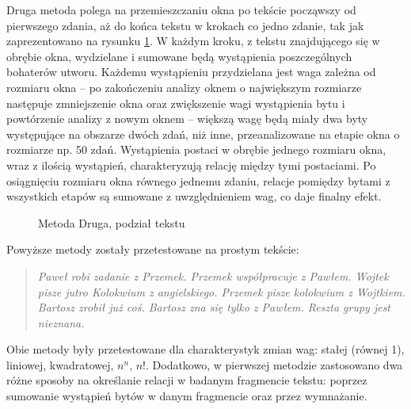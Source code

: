 \documentclass[12pt,a4paper]{article} %
\begin{document}
Druga metoda polega na przemieszczaniu okna po tekście począwszy od pierwszego zdania, aż do końca tekstu w krokach co jedno zdanie, tak jak zaprezentowano na rysunku \ref{fig:plyw}. W każdym kroku, z tekstu znajdującego się w obrębie okna, wydzielane i sumowane będą wystąpienia poszczególnych bohaterów utworu. Każdemu wystąpieniu przydzielana jest waga zależna od rozmiaru okna -- po zakończeniu analizy oknem o największym rozmiarze następuje zmniejszenie okna oraz zwiększenie wagi wystąpienia bytu i powtórzenie analizy z nowym oknem -- większą wagę będą miały dwa byty występujące na obszarze dwóch zdań, niż inne, przeanalizowane na etapie okna o rozmiarze np. 50 zdań. Wystąpienia postaci w obrębie jednego rozmiaru okna, wraz z ilością wystąpień, charakteryzują relację między tymi postaciami. Po osiągnięciu rozmiaru okna równego jednemu zdaniu, relacje pomiędzy bytami z wszystkich etapów są sumowane z uwzględnieniem wag, co daje finalny efekt.
\begin{figure}[!h]
\caption{Metoda Druga, podział tekstu}
\label{fig:plyw}
\centering
\end{figure}

Powyższe metody zostały przetestowane na prostym tekście:
\begin{quote}
    \textit{
        Paweł robi zadanie z Przemek.
        Przemek współpracuje z Pawłem.
        Wojtek pisze jutro Kolokwium z angielskiego.
        Przemek pisze kolokwium z Wojtkiem.
        Bartosz zrobił już coś.
        Bartosz zna się tylko z Pawłem.
        Reszta grupy jest nieznana.}
\end{quote}

Obie metody były przetestowane dla charakterystyk zmian wag: stałej (równej 1), liniowej, kwadratowej, $n^n$, $n!$. Dodatkowo, w pierwszej metodzie zastosowano dwa różne sposoby na określanie relacji w badanym fragmencie tekstu: poprzez sumowanie wystąpień bytów w danym fragmencie oraz przez wymnażanie.
\end{document}
